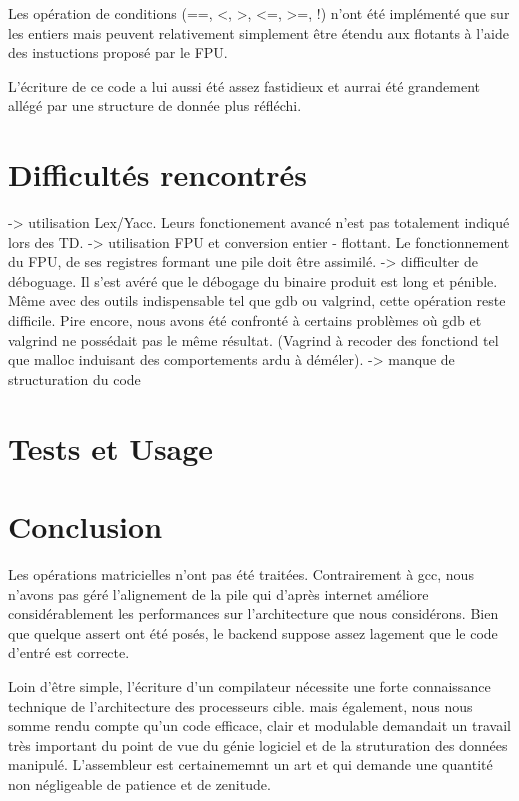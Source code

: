 \documentclass[a4paper, 11pt]{article}
\begin{document}
Les opération de conditions (==, <, >, <=, >=, !) n'ont été implémenté que sur les entiers mais peuvent relativement simplement être étendu
aux flotants à l'aide des instuctions proposé par le FPU.

L'écriture de ce code a lui aussi été assez fastidieux et aurrai été grandement allégé par une structure de donnée plus réfléchi.

\section{Difficultés rencontrés}
-> utilisation Lex/Yacc. Leurs fonctionement avancé n'est pas totalement indiqué lors des TD.
-> utilisation FPU et conversion entier - flottant. Le fonctionnement du FPU, de ses registres formant une pile doit être assimilé.
-> difficulter de déboguage. Il s'est avéré que le débogage du binaire produit est long et pénible. Même avec des outils indispensable tel que
gdb ou valgrind, cette opération reste difficile. Pire encore, nous avons été confronté à certains problèmes où gdb et valgrind ne possédait
pas le même résultat. (Vagrind à recoder des fonctiond tel que malloc induisant des comportements ardu à déméler).
-> manque de structuration du code

\section{Tests et Usage}

\section{Conclusion}

Les opérations matricielles n'ont pas été traitées. Contrairement à gcc, nous n'avons pas géré l'alignement de la pile qui d'après internet
améliore considérablement les performances sur l'architecture que nous considérons. Bien que quelque assert ont été posés, le backend 
suppose assez lagement que le code d'entré est correcte.

Loin d'être simple, l'écriture d'un compilateur nécessite une forte connaissance technique de l'architecture des processeurs cible.  mais 
également, nous nous somme rendu compte qu'un code efficace, clair et modulable demandait un travail très important du point de vue du
génie logiciel et de la struturation des données manipulé.
L'assembleur est certainememnt un art et qui demande une quantité non négligeable de patience et de zenitude.
\end{document}
